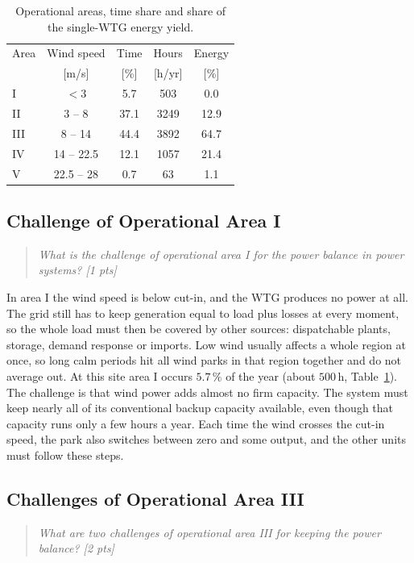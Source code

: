 \begin{table}[H]
    \centering
    \caption{Operational areas, time share and share of the single-WTG energy yield.}
    \label{tab:elec-areas}
    \begin{tabular}{lcccc}
        \hline
        Area & Wind speed & Time & Hours & Energy \\
        & [m/s] & [\%] & [h/yr] & [\%] \\
        \hline
        I   & $< 3$       & 5.7  & 503   & 0.0  \\
        II  & 3 -- 8      & 37.1 & 3249  & 12.9 \\
        III & 8 -- 14     & 44.4 & 3892  & 64.7 \\
        IV  & 14 -- 22.5  & 12.1 & 1057  & 21.4 \\
        V   & 22.5 -- 28  & 0.7  & 63    & 1.1  \\
        \hline
    \end{tabular}
\end{table}

\subsection{Challenge of Operational Area I}
\label{sec:elec-area1}
\begin{quote}
\emph{What is the challenge of operational area I for the power balance in power systems? [1 pts]}
\end{quote}

In area I the wind speed is below cut-in, and the WTG produces no power at all. The grid still has to keep generation equal to load plus losses at every moment, so the whole load must then be covered by other sources: dispatchable plants, storage, demand response or imports. Low wind usually affects a whole region at once, so long calm periods hit all wind parks in that region together and do not average out. At this site area I occurs $5.7\,\%$ of the year (about $500\,\mathrm{h}$, Table~\ref{tab:elec-areas}). The challenge is that wind power adds almost no firm capacity. The system must keep nearly all of its conventional backup capacity available, even though that capacity runs only a few hours a year. Each time the wind crosses the cut-in speed, the park also switches between zero and some output, and the other units must follow these steps.

\subsection{Challenges of Operational Area III}
\label{sec:elec-area3}
\begin{quote}
\emph{What are two challenges of operational area III for keeping the power balance? [2 pts]}
\end{quote}

